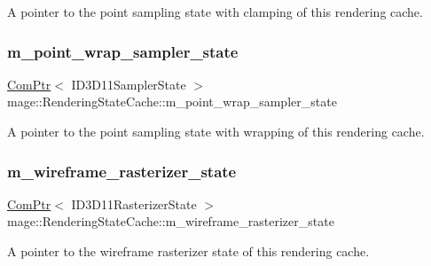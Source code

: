 A pointer to the point sampling state with clamping of this rendering cache. \hypertarget{structmage_1_1_rendering_state_cache_ae4011d6ce5effbacf3fd69ffa5d46ebc}{}\label{structmage_1_1_rendering_state_cache_ae4011d6ce5effbacf3fd69ffa5d46ebc} 
\subsubsection{\texorpdfstring{m\+\_\+point\+\_\+wrap\+\_\+sampler\+\_\+state}{m\_point\_wrap\_sampler\_state}}
{\footnotesize\ttfamily \hyperlink{namespacemage_ae74f374780900893caa5555d1031fd79}{Com\+Ptr}$<$ I\+D3\+D11\+Sampler\+State $>$ mage\+::\+Rendering\+State\+Cache\+::m\+\_\+point\+\_\+wrap\+\_\+sampler\+\_\+state\hspace{0.3cm}{\ttfamily [private]}}

A pointer to the point sampling state with wrapping of this rendering cache. \hypertarget{structmage_1_1_rendering_state_cache_a2fddb539c6cb42feb3c54b73ad2fe800}{}\label{structmage_1_1_rendering_state_cache_a2fddb539c6cb42feb3c54b73ad2fe800} 
\subsubsection{\texorpdfstring{m\+\_\+wireframe\+\_\+rasterizer\+\_\+state}{m\_wireframe\_rasterizer\_state}}
{\footnotesize\ttfamily \hyperlink{namespacemage_ae74f374780900893caa5555d1031fd79}{Com\+Ptr}$<$ I\+D3\+D11\+Rasterizer\+State $>$ mage\+::\+Rendering\+State\+Cache\+::m\+\_\+wireframe\+\_\+rasterizer\+\_\+state\hspace{0.3cm}{\ttfamily [private]}}

A pointer to the wireframe rasterizer state of this rendering cache. 